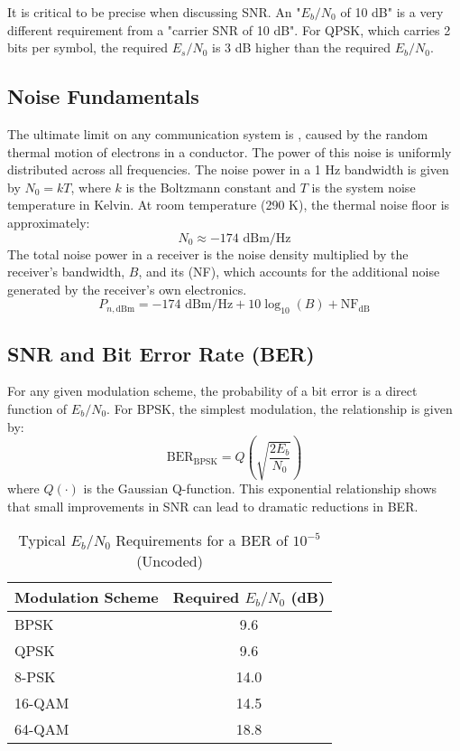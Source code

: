 \begin{warningbox}
    It is critical to be precise when discussing SNR. An "$E_b/N_0$ of 10 dB" is a very different requirement from a "carrier SNR of 10 dB". For QPSK, which carries 2 bits per symbol, the required $E_s/N_0$ is 3 dB higher than the required $E_b/N_0$.
\end{warningbox}


\subsection{Noise Fundamentals}

The ultimate limit on any communication system is , caused by the random thermal motion of electrons in a conductor. The power of this noise is uniformly distributed across all frequencies.
The noise power in a 1 Hz bandwidth is given by $N_0 = kT$, where $k$ is the Boltzmann constant and $T$ is the system noise temperature in Kelvin. At room temperature (290 K), the thermal noise floor is approximately:
\[ N_0 \approx -174 \text{ dBm/Hz} \]
The total noise power in a receiver is the noise density multiplied by the receiver's bandwidth, $B$, and its  (NF), which accounts for the additional noise generated by the receiver's own electronics.
\begin{equation}
    P_{n, \text{dBm}} = -174 \text{ dBm/Hz} + 10\log_{10}(B) + \text{NF}_{\text{dB}}
\end{equation}


\subsection{SNR and Bit Error Rate (BER)}

For any given modulation scheme, the probability of a bit error is a direct function of $E_b/N_0$. For BPSK, the simplest modulation, the relationship is given by:
\begin{equation}
    \text{BER}_{\text{BPSK}} = Q\left(\sqrt{\frac{2E_b}{N_0}}\right)
\end{equation}
where $Q(\cdot)$ is the Gaussian Q-function. This exponential relationship shows that small improvements in SNR can lead to dramatic reductions in BER.

\begin{table}[H]
    \centering
    \caption{Typical $E_b/N_0$ Requirements for a BER of $10^{-5}$ (Uncoded)}
    \label{tab:snr-ber-reqs}
    \begin{tabular}{@{}lc@{}}
        \toprule
        \tableheaderfont Modulation Scheme & \tableheaderfont Required $E_b/N_0$ (dB) \\
        \midrule
        BPSK & 9.6 \\
        QPSK & 9.6 \\
        8-PSK & 14.0 \\
        16-QAM & 14.5 \\
        64-QAM & 18.8 \\
        \bottomrule
    \end{tabular}
\end{table}


